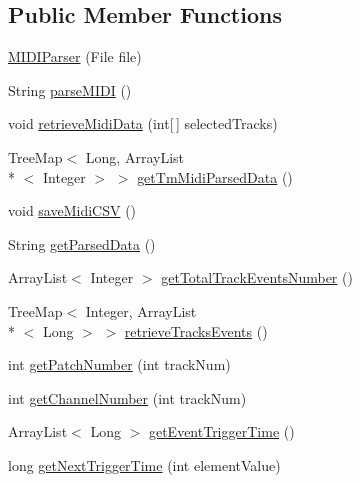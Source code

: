 \subsection*{Public Member Functions}
\begin{DoxyCompactItemize}
\item 
\hyperlink{classcom_1_1lclion_1_1midiparser_1_1_m_i_d_i_parser_a42fc840125b67cc2511f12c7f6d1a362}{M\+I\+D\+I\+Parser} (File file)
\item 
String \hyperlink{classcom_1_1lclion_1_1midiparser_1_1_m_i_d_i_parser_a79cff8d5b2c0721d1871f65536fca8aa}{parse\+M\+I\+D\+I} ()
\item 
void \hyperlink{classcom_1_1lclion_1_1midiparser_1_1_m_i_d_i_parser_a6356cc4e4568eaf610999c4b32431749}{retrieve\+Midi\+Data} (int\mbox{[}$\,$\mbox{]} selected\+Tracks)
\item 
Tree\+Map$<$ Long, Array\+List\\*
$<$ Integer $>$ $>$ \hyperlink{classcom_1_1lclion_1_1midiparser_1_1_m_i_d_i_parser_af1c1599b923aa52978623f10a08d4d97}{get\+Tm\+Midi\+Parsed\+Data} ()
\item 
void \hyperlink{classcom_1_1lclion_1_1midiparser_1_1_m_i_d_i_parser_a31bfbd201be76f49735d3df6c362980a}{save\+Midi\+C\+S\+V} ()
\item 
String \hyperlink{classcom_1_1lclion_1_1midiparser_1_1_m_i_d_i_parser_ab52f7b2d5fc11fad840da51a5b49ab0e}{get\+Parsed\+Data} ()
\item 
Array\+List$<$ Integer $>$ \hyperlink{classcom_1_1lclion_1_1midiparser_1_1_m_i_d_i_parser_a5344cfe20b2847e6b1126b799c03e54e}{get\+Total\+Track\+Events\+Number} ()
\item 
Tree\+Map$<$ Integer, Array\+List\\*
$<$ Long $>$ $>$ \hyperlink{classcom_1_1lclion_1_1midiparser_1_1_m_i_d_i_parser_a25947e3c729a3eb6a7701dae3634b9b6}{retrieve\+Tracks\+Events} ()
\item 
int \hyperlink{classcom_1_1lclion_1_1midiparser_1_1_m_i_d_i_parser_a9ea2bab3f45e0b74eba2c08c635d4866}{get\+Patch\+Number} (int track\+Num)
\item 
int \hyperlink{classcom_1_1lclion_1_1midiparser_1_1_m_i_d_i_parser_aecc53ce49126b72aa5a52b01389b6e94}{get\+Channel\+Number} (int track\+Num)
\item 
Array\+List$<$ Long $>$ \hyperlink{classcom_1_1lclion_1_1midiparser_1_1_m_i_d_i_parser_aaa7385baef162e66f5dd608c345dda8d}{get\+Event\+Trigger\+Time} ()
\item 
long \hyperlink{classcom_1_1lclion_1_1midiparser_1_1_m_i_d_i_parser_a36449f95958a9f33a6bf44945252e2d7}{get\+Next\+Trigger\+Time} (int element\+Value)

\end{DoxyCompactItemize}
